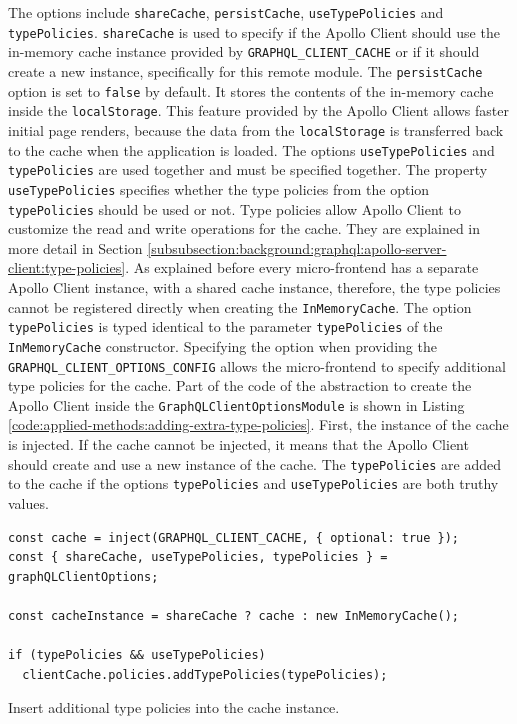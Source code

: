 \noindent The options include \texttt{shareCache}, \texttt{persistCache}, \texttt{useTypePolicies} and \texttt{typePolicies}. \texttt{shareCache} is used to specify if the Apollo Client should use the in-memory cache instance provided by \texttt{GRAPHQL\_CLIENT\_CACHE} or if it should create a new instance, specifically for this remote module. The \texttt{persistCache} option is set to \texttt{false} by default. It stores the contents of the in-memory cache inside the \texttt{localStorage}. This feature provided by the Apollo Client allows faster initial page renders, because the data from the \texttt{localStorage} is transferred back to the cache when the application is loaded. The options \texttt{useTypePolicies} and \texttt{typePolicies} are used together and must be specified together. The property \texttt{useTypePolicies} specifies whether the type policies from the option \texttt{typePolicies} should be used or not. Type policies allow Apollo Client to customize the read and write operations for the cache. They are explained in more detail in Section \ref{subsubsection:background:graphql:apollo-server-client:type-policies}. As explained before every micro-frontend has a separate Apollo Client instance, with a shared cache instance, therefore, the type policies cannot be registered directly when creating the \texttt{InMemoryCache}. The option \texttt{typePolicies} is typed identical to the parameter \texttt{typePolicies} of the \texttt{InMemoryCache} constructor. Specifying the option when providing the \texttt{GRAPHQL\_CLIENT\_OPTIONS\_CONFIG} allows the micro-frontend to specify additional type policies for the cache. Part of the code of the abstraction to create the Apollo Client inside the \texttt{GraphQLClientOptionsModule} is shown in Listing \ref{code:applied-methods:adding-extra-type-policies}. First, the instance of the cache is injected. If the cache cannot be injected, it means that the Apollo Client should create and use a new instance of the cache. The \texttt{typePolicies} are added to the cache if the options \texttt{typePolicies} and \texttt{useTypePolicies} are both truthy values.

\ifshowListings
\begin{listing}[H]
\begin{verbatim}
const cache = inject(GRAPHQL_CLIENT_CACHE, { optional: true });
const { shareCache, useTypePolicies, typePolicies } = graphQLClientOptions;

const cacheInstance = shareCache ? cache : new InMemoryCache();

if (typePolicies && useTypePolicies)
  clientCache.policies.addTypePolicies(typePolicies);
\end{verbatim}
\caption{Insert additional type policies into the cache instance.}\label{code:applied-methods:adding-extra-type-policies}
\end{listing}
\fi
